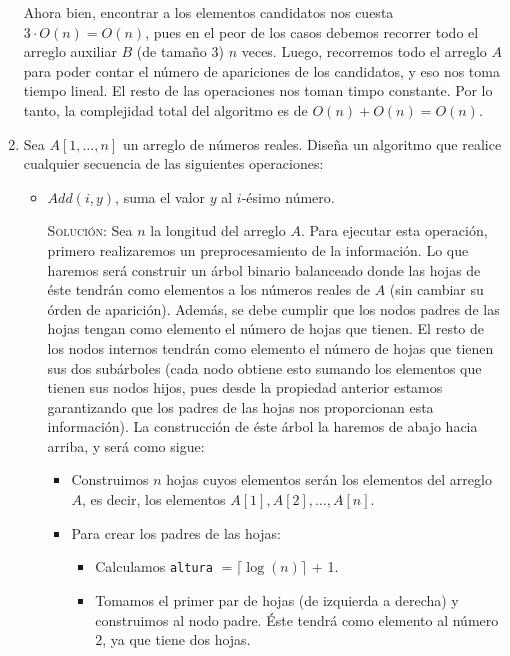 \documentclass[letterpaper,11pt]{article}
\begin{document}
\begin{enumerate}
    Ahora bien, encontrar a los elementos candidatos nos cuesta 
    $3 \cdot O(n) = O(n)$, pues en el peor de los casos debemos recorrer todo 
    el arreglo auxiliar $B$ (de tamaño $3$) $n$ veces. Luego, recorremos 
    todo el arreglo $A$ para poder contar el número de apariciones de los 
    candidatos, y eso nos toma tiempo lineal. El resto de las operaciones nos 
    toman timpo constante. Por lo tanto, la complejidad total del algoritmo es 
    de $O(n) + O(n) = O(n)$.

    \item Sea $A[1, \ldots , n]$ un arreglo de números reales. Diseña un 
    algoritmo que realice cualquier secuencia de las siguientes operaciones:

	\begin{itemize}
        \item $Add(i, y)$,  suma el valor $y$ al $i$-ésimo número.

        \textsc{Solución:} Sea $n$ la longitud del arreglo $A$. Para ejecutar
        esta operación, primero realizaremos un preprocesamiento de la 
        información. Lo que haremos será construir un árbol binario balanceado 
        donde las hojas de éste tendrán como elementos a los números reales de 
        $A$ (sin cambiar su órden de aparición). Además, se debe cumplir que 
        los nodos padres de las hojas tengan como elemento el número de hojas 
        que tienen. El resto de los nodos internos tendrán como elemento el 
        número de hojas que tienen sus dos subárboles (cada nodo obtiene esto 
        sumando los elementos que tienen sus nodos hijos, pues desde la 
        propiedad anterior estamos garantizando que los padres de las hojas nos 
        proporcionan esta información). La construcción de éste árbol la haremos 
        de abajo hacia arriba, y será como sigue:
        \begin{itemize}
            \item Construimos $n$ hojas cuyos elementos serán los elementos del 
            arreglo $A$, es decir, los elementos $A[1], A[2], \ldots, A[n]$.

            \item Para crear los padres de las hojas:
            \begin{itemize}
                \item Calculamos \texttt{altura} $= \lceil \log(n)\rceil$ + 1. 
    
                \item Tomamos el primer par de hojas (de izquierda a derecha) y 
                construimos al nodo padre. Éste tendrá como elemento al número 
                $2$, ya que tiene dos hojas.
    

\end{itemize}
\end{itemize}
\end{itemize}
\end{enumerate}
\end{document}
